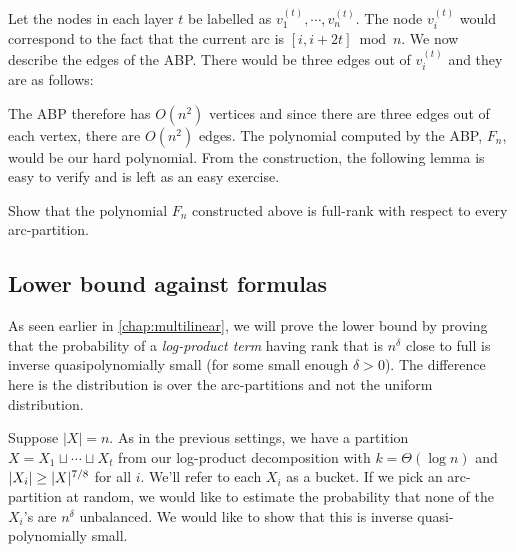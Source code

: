 Let the nodes in each layer $t$ be labelled as $v_1^{(t)},\cdots, v_n^{(t)}$.
The node $v_i^{(t)}$ would correspond to the fact that the current arc is $[i,i+2t] \bmod{n}$.
We now describe the edges of the ABP.
There would be three edges out of $v_i^{(t)}$ and they are as follows:


The ABP therefore has $O(n^2)$ vertices and since there are three edges out of each vertex, there are $O(n^2)$ edges.
The polynomial computed by the ABP, $F_n$, would be our hard polynomial.
From the construction, the following lemma is easy to verify and is left as an easy exercise.

\begin{exercise}
  Show that the polynomial $F_n$ constructed above is full-rank with respect to every arc-partition.
\end{exercise}


\subsection{Lower bound against formulas}

As seen earlier in \autoref{chap:multilinear}, we will prove the lower bound by proving that the probability of a \emph{log-product term} having rank that is $n^{\delta}$ close to full is inverse quasipolynomially small (for some small enough $\delta > 0$).
The difference here is the distribution is over the arc-partitions and not the uniform distribution.

Suppose $|X| = n$.
As in the previous settings, we have a partition $X = X_1 \sqcup \cdots \sqcup X_t$ from our log-product decomposition with $k = \Theta(\log n)$ and $\left|X_i\right| \geq |X|^{7/8}$ for all $i$.
We'll refer to each $X_i$ as a bucket.
If we pick an arc-partition at random, we would like to estimate the probability that none of the $X_i$'s are $n^\delta$ unbalanced.
We would like to show that this is inverse quasi-polynomially small.


